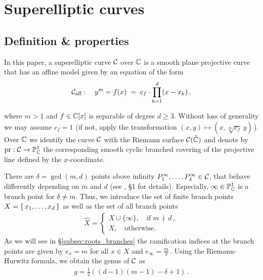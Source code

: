 \documentclass[main.tex]{subfiles}
\begin{document}
  \section{Superelliptic curves}

  \subsection{Definition \& properties}
    
    \begin{defn}\label{def:se_curve}
    In this paper, a superelliptic curve $\mathcal{C}$ over $\mathbb{C}$ is a smooth plane projective curve that has an affine model given by an equation of the form 
   \begin{align}\label{eq:aff_model}
    \mathcal{C}_{\text{aff}} : \quad y^m = f(x) \;= \; c_f \cdot \prod_{k=1}^d (x-x_k)\,,
   \end{align}
   \end{defn}
   where $m > 1$ and $f \in \mathbb{C}[x]$ is separable of degree $d \ge 3$. 
   Without loss of generality we may assume $c_f = 1$ (if not, apply the transformation $(x,y) \mapsto (x,\sqrt[m]{c_f}\,y)$\,).  \abstand
   Over $\mathbb{C}$ we identify the curve $\mathcal{C}$ with the Riemann surface $\mathcal{C}(\hat{\mathbb{C}})$ and denote by $\operatorname{pr} : \mathcal{C} \rightarrow \mathbb{P}^1_{\mathbb{C}}$ the corresponding smooth cyclic branched covering of the projective line
   defined by the $x$-coordinate.
   
  There are $\delta = \gcd(m,d)$ points above infinity $P_1^{\infty},\dots,P_{\delta}^{\infty} \in \mathcal{C}$, that behave differently depending on $m$ and $d$ (see \cite{CT1996}, \S 1 for details). 
  Especially, $\infty \in \mathbb{P}^1_{\mathbb{C}}$ is a branch point for $\delta \ne m$. Thus, we introduce the set of finite branch points $X = \{ \, x_1,\dots,x_d \,\}$ as well as the set of all branch points
  \vspace{-0.3cm}
  \begin{align}\label{eq:branch_points}
         \hat{X} = \begin{cases}   X \cup \{ \infty \}, \quad \text{if} \; m \, \nmid \, d\,,\\
         X,\quad \text{otherwise.}
     \end{cases}
  \end{align} 
  As we will see in \S \ref{subsec:roots_branches} the ramification indices at the branch points are given by $e_x = m$ for all $x \in X$ and $e_{\infty} = \frac{m}{\delta}$\,. Using the
  Riemann-Hurwitz formula, we obtain the genus of $\mathcal{C}$ as
   \vspace{-0.3cm}
  \begin{align}\label{eq:genus}
    g = \frac{1}{2}( (d-1)(m-1) - \delta + 1)\,.
  \end{align}
\end{document}
